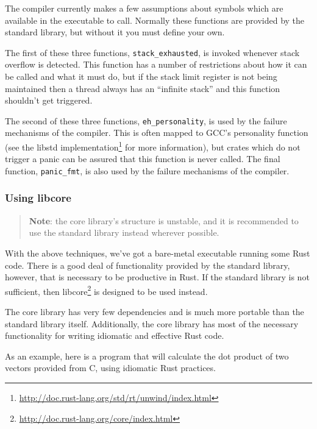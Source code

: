 \documentclass[a4paper,]{book}
\renewcommand{\href}[2]{#2\footnote{\url{#1}}}
\begin{document}
The compiler currently makes a few assumptions about symbols which are
available in the executable to call. Normally these functions are
provided by the standard library, but without it you must define your
own.

The first of these three functions, \texttt{stack\_exhausted}, is
invoked whenever stack overflow is detected. This function has a number
of restrictions about how it can be called and what it must do, but if
the stack limit register is not being maintained then a thread always
has an ``infinite stack'' and this function shouldn't get triggered.

The second of these three functions, \texttt{eh\_personality}, is used
by the failure mechanisms of the compiler. This is often mapped to GCC's
personality function (see the
\href{http://doc.rust-lang.org/std/rt/unwind/index.html}{libstd
implementation} for more information), but crates which do not trigger a
panic can be assured that this function is never called. The final
function, \texttt{panic\_fmt}, is also used by the failure mechanisms of
the compiler.

\subsubsection{Using libcore}\label{using-libcore}

\begin{quote}
\textbf{Note}: the core library's structure is unstable, and it is
recommended to use the standard library instead wherever possible.
\end{quote}

With the above techniques, we've got a bare-metal executable running
some Rust code. There is a good deal of functionality provided by the
standard library, however, that is necessary to be productive in Rust.
If the standard library is not sufficient, then
\href{http://doc.rust-lang.org/core/index.html}{libcore} is designed to
be used instead.

The core library has very few dependencies and is much more portable
than the standard library itself. Additionally, the core library has
most of the necessary functionality for writing idiomatic and effective
Rust code.

As an example, here is a program that will calculate the dot product of
two vectors provided from C, using idiomatic Rust practices.
\end{document}

